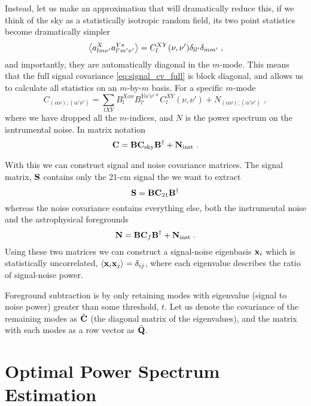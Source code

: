 \documentclass[prd,twocolumn,nofootinbib]{revtex4}
\begin{document}
Instead, let us make an approximation that will dramatically reduce this, if we
think of the sky as a statistically isotropic random field, its two point
statistics become dramatically simpler
\begin{equation}
\left\langle a_{l m \nu'}^X a_{l' m' \nu'}^{Y *} \right\rangle = C^{XY}_l(\nu, \nu') \delta_{l l'}
\delta_{m m'} \; ,
\end{equation}
and importantly, they are automatically diagonal in the $m$-mode. This means
that the full signal covariance \eqref{eq:signal_cv_full} is block diagonal, and
allows us to calculate all statistics on an $m$-by-$m$ basis. For a specific
$m$-mode
\begin{equation}
C_{(\alpha \nu); (\alpha' \nu')} = \sum_{l X Y} B^{X \alpha \nu}_{l} B^{Y \alpha'
  \nu' *}_{l'} C^{XY}_l(\nu, \nu') + N_{(\alpha \nu); (\alpha' \nu')} \; ,
\end{equation}
where we have dropped all the $m$-indices, and $N$ is the power spectrum on the
isntrumental noise. In matrix notation
\begin{equation}
\mathbf{C} = \mathbf{B} \mathbf{C}_\text{sky} \mathbf{B}^{\dagger} + \mathbf{N}_\text{inst} \; .
\end{equation}

With this we can construct signal and noise covariance matrices. The signal
matrix, $\mathbf{S}$ contains only the 21-cm signal the we want to extract
\begin{equation}
\mathbf{S} = \mathbf{B} \mathbf{C}_{21} \mathbf{B}^{\dagger}
\end{equation}
whereas the noise covariance contains everything else, both the instrumental
noise and the astrophysical foregrounds
\begin{equation}
\mathbf{N} = \mathbf{B} \mathbf{C}_f \mathbf{B}^{\dagger} + \mathbf{N}_\text{inst} \; .
\end{equation}
Using these two matrices we can construct a signal-noise eigenbasis $\mathbf{x}_i$
which is statistically uncorrelated, $\left\langle \mathbf{x}_i \mathbf{x}_j \right\rangle = \delta_{ij}$, where
each eigenvalue describes the ratio of signal-noise power.

Foreground subtraction is by only retaining modes with eigenvalue (signal to
noise power) greater than some threshold, $t$. Let us denote the covariance of
the remaining modes as $\tilde{\mathbf{C}}$ (the diagonal matrix of the eigenvalues),
and the matrix with each modes as a row vector as $\tilde{\mathbf{Q}}$.

\section{Optimal Power Spectrum Estimation}
\end{document}
